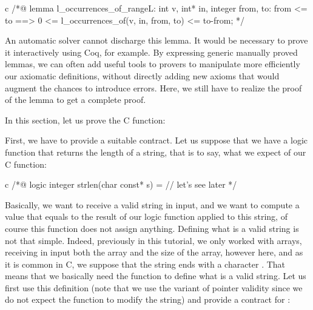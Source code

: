 \begin{CodeBlock}{c}
/*@
lemma l_occurrences_of_range{L}:
  \forall int v, int* in, integer from, to:
    from <= to ==> 0 <= l_occurrences_of(v, in, from, to) <= to-from;
*/
\end{CodeBlock}



An automatic solver cannot discharge this lemma. It would be necessary
to prove it interactively using Coq, for example. By expressing generic
manually proved lemmas, we can often add useful tools to provers to
manipulate more efficiently our axiomatic definitions, without directly
adding new axioms that would augment the chances to introduce errors.
Here, we still have to realize the proof of the lemma to get a complete
proof.




In this section, let us prove the C  function:




First, we have to provide a suitable contract. Let us suppose that we
have a logic function  that returns the length of a
string, that is to say, what we expect of our C function:


\begin{CodeBlock}{c}
/*@
  logic integer strlen(char const* s) = // let's see later
*/
\end{CodeBlock}



Basically, we want to receive a valid string in input, and we want to
compute a value that equals to the result of our logic function
 applied to this string, of course this function
does not assign anything. Defining what is a valid string is not that
simple. Indeed, previously in this tutorial, we only worked with
arrays, receiving in input both the array and the size of the array,
however here, and as it is common in C, we suppose that the string ends
with a character . That means that we
basically need the  function to define what is a
valid string. Let us first use this definition (note that we use the
 variant of pointer validity
since we do not expect the function to modify the string) and provide
a contract for :






